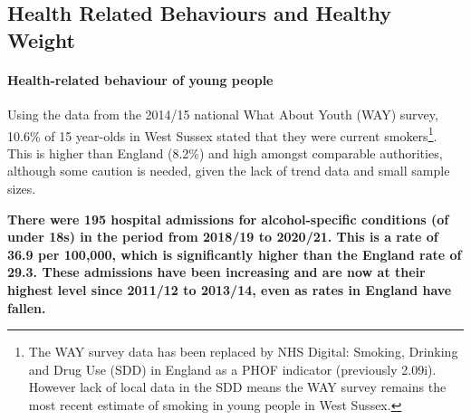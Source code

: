 



\subsection{Health Related Behaviours and Healthy Weight}
\paragraph{Health-related behaviour of young people} 
Using the data from the 2014/15 national What About Youth (WAY) survey, 10.6\% of 15 year-olds in West Sussex stated that they were current smokers\footnote{The WAY survey data has been replaced by NHS Digital: Smoking, Drinking and Drug Use (SDD) in England as a PHOF indicator (previously 2.09i). However lack of local data in the SDD means the WAY survey remains the most recent estimate of smoking in young people in West Sussex.}. This is higher than England (8.2\%) and high amongst comparable authorities, although some caution is needed, given the lack of trend data and small sample sizes.

{\bfseries There were 195 hospital admissions for alcohol-specific conditions (of under 18s) in the period from 2018/19 to 2020/21. This is a rate of 36.9 per 100,000, which is significantly higher than the England rate of 29.3. These admissions have been increasing and are now at their highest level since 2011/12 to 2013/14, even as rates in England have fallen.}

